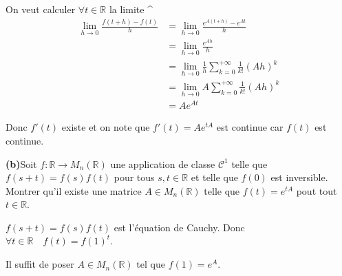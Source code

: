 \documentclass[french]{article}
\begin{document}
	On veut calculer $\forall t \in \mathbb{R}$ la limite 
	^
	\begin{align}
		\lim_{h \to 0} \frac{f(t+h) - f(t)}{h} &= \lim_{h \to 0} \frac{e^{A(t+h)} - e^{At}}{h} \\
		&= \lim_{h \to 0} \frac{e^{Ah}}{h}\\
		&= \lim_{h \to 0} \frac{1}{h} \sum_{k = 0}^{+\infty} \frac{1}{k!} (Ah)^k\\
		&= \lim_{h \to 0} A \sum_{k = 0}^{+\infty} \frac{1}{k!} (Ah)^k \\
		&= A e^{At}
	\end{align}
	
	Donc $f'(t)$ existe et on note que $f'(t) = Ae^{tA}$ est continue car $f(t)$ est continue.
	

	\begin{tcolorbox}[colback=gray!5!white,colframe=gray!75!black]
		\textbf{\large{(b)}}Soit $f:\mathbb{R} \to M_n(\mathbb{R})$ une application de classe $\mathcal{C}^1$ telle que $f(s+t) = f(s)f(t)$ pour tous $s,t \in \mathbb{R}$ et telle que $f(0)$ est inversible. Montrer qu'il existe une matrice $A \in M_n(\mathbb{R})$ telle que $f(t) = e^{tA}$ pout tout $t \in \mathbb{R}$.
	\end{tcolorbox}

	$f(s+t) = f(s)f(t)$ est l'équation de Cauchy. Donc $\forall t \in \mathbb{R} \quad f(t) = f(1)^t$.
	
	Il suffit de poser $A \in M_n(\mathbb{R})$ tel que $f(1) = e^A$.
	
\end{document}
